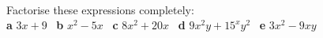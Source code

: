 \documentclass[fleqn, twoside]{article}
\begin{document}
\begin{examplebox}{}{}
    \\ %
    Factorise these expressions completely:    \\
    \textbf{a}\hspace{2mm} $3x+9$              \hspace{7mm} \
    \textbf{b}\hspace{2mm} $x^2-5x$            \hspace{7mm} \
    \textbf{c}\hspace{2mm} $8x^2+20x$          \hspace{7mm} \
    \textbf{d}\hspace{2mm} $9x^2y+15^xy^2$     \hspace{7mm} \
    \textbf{e}\hspace{2mm} $3x^2-9xy$          \hspace{7mm} \
\end{examplebox}
\end{document}
